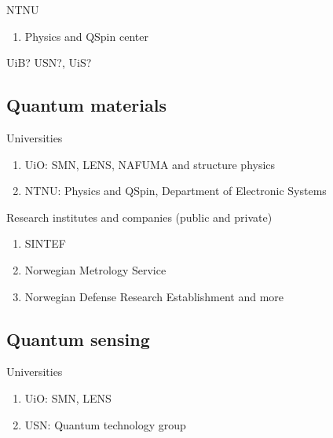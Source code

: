 \documentclass[%
oneside,                 %
final,                   %
10pt]{article}
\begin{document}
\begin{block}{NTNU }
\begin{enumerate}
\item Physics and QSpin center
\end{enumerate}

\noindent
\end{block}

UiB? USN?, UiS?

\subsection{Quantum materials}

\begin{block}{Universities }
\begin{enumerate}
\item UiO: SMN, LENS, NAFUMA and structure physics

\item NTNU: Physics and QSpin, Department of Electronic Systems
\end{enumerate}

\noindent
\end{block}

\begin{block}{Research institutes and companies (public and private) }
\begin{enumerate}
\item SINTEF

\item Norwegian Metrology Service

\item Norwegian Defense Research Establishment and more
\end{enumerate}

\noindent
\end{block}

\subsection{Quantum sensing}

\begin{block}{Universities }
\begin{enumerate}
\item UiO: SMN, LENS

\item USN: Quantum technology group
\end{enumerate}

\noindent
\end{block}
\end{document}
